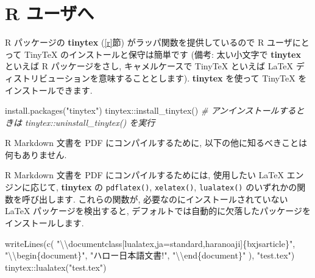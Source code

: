 \documentclass[
  xelatex,ja=standard,jafont=noto]{bxjsreport}
\newenvironment{Shaded}{\begin{snugshade}}{\end{snugshade}}
\newcommand{\CommentTok}[1]{\textcolor[rgb]{0.56,0.35,0.01}{\textit{#1}}}
\newcommand{\FunctionTok}[1]{\textcolor[rgb]{0.00,0.00,0.00}{#1}}
\newcommand{\NormalTok}[1]{#1}
\newcommand{\SpecialCharTok}[1]{\textcolor[rgb]{0.00,0.00,0.00}{#1}}
\newcommand{\StringTok}[1]{\textcolor[rgb]{0.31,0.60,0.02}{#1}}
\begin{document}
\hypertarget{r-ux30e6ux30fcux30b6ux3078}{%
\section{R ユーザへ}\label{r-ux30e6ux30fcux30b6ux3078}}

R パッケージの \textbf{tinytex} (\ref{r}節)
がラッパ関数を提供しているので R ユーザにとって TinyTeX
のインストールと保守は簡単です (備考: 太い小文字で \textbf{tinytex}
といえば R パッケージをさし, キャメルケースで TinyTeX といえば LaTeX
ディストリビューションを意味することとします). \textbf{tinytex} を使って
TinyTeX をインストールできます.

\begin{Shaded}
\begin{Highlighting}[numbers=left,,]
\FunctionTok{install.packages}\NormalTok{(}\StringTok{"tinytex"}\NormalTok{)}
\NormalTok{tinytex}\SpecialCharTok{::}\FunctionTok{install\_tinytex}\NormalTok{()}
\CommentTok{\# アンインストールするときは tinytex::uninstall\_tinytex() を実行}
\end{Highlighting}
\end{Shaded}

R Markdown 文書を PDF にコンパイルするために,
以下の他に知るべきことは何もありません.

R Markdown 文書を PDF にコンパイルするためには, 使用したい LaTeX
エンジンに応じて, \textbf{tinytex} の \texttt{pdflatex()},
\texttt{xelatex()}, \texttt{lualatex()} のいずれかの関数を呼び出します.
これらの関数が, 必要なのにインストールされていない LaTeX
パッケージを検出すると,
デフォルトでは自動的に欠落したパッケージをインストールします.

\begin{Shaded}
\begin{Highlighting}[numbers=left,,]
\FunctionTok{writeLines}\NormalTok{(}\FunctionTok{c}\NormalTok{(}
  \StringTok{"}\SpecialCharTok{\textbackslash{}\textbackslash{}}\StringTok{documentclass[lualatex,ja=standard,haranoaji]\{bxjsarticle\}"}\NormalTok{,}
  \StringTok{"}\SpecialCharTok{\textbackslash{}\textbackslash{}}\StringTok{begin\{document\}"}\NormalTok{, }\StringTok{"ハロー日本語文書!"}\NormalTok{, }\StringTok{"}\SpecialCharTok{\textbackslash{}\textbackslash{}}\StringTok{end\{document\}"}
\NormalTok{), }\StringTok{"test.tex"}\NormalTok{)}
\NormalTok{tinytex}\SpecialCharTok{::}\FunctionTok{lualatex}\NormalTok{(}\StringTok{"test.tex"}\NormalTok{)}
\end{Highlighting}
\end{Shaded}
\end{document}
